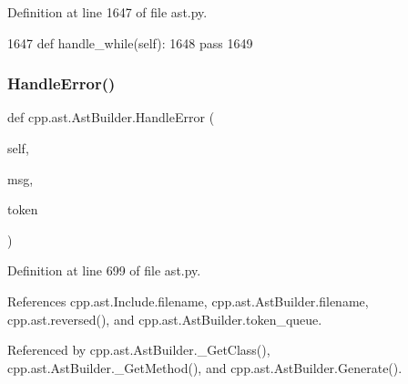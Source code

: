 Definition at line 1647 of file ast.\+py.


\begin{DoxyCode}
1647     \textcolor{keyword}{def }handle\_while(self):
1648         \textcolor{keywordflow}{pass}
1649 
\end{DoxyCode}
\mbox{\label{classcpp_1_1ast_1_1AstBuilder_a3e610662018d674f6c57ef19254cc470}} 
\subsubsection{\texorpdfstring{Handle\+Error()}{HandleError()}}
{\footnotesize\ttfamily def cpp.\+ast.\+Ast\+Builder.\+Handle\+Error (\begin{DoxyParamCaption}\item[{}]{self,  }\item[{}]{msg,  }\item[{}]{token }\end{DoxyParamCaption})}



Definition at line 699 of file ast.\+py.



References cpp.\+ast.\+Include.\+filename, cpp.\+ast.\+Ast\+Builder.\+filename, cpp.\+ast.\+reversed(), and cpp.\+ast.\+Ast\+Builder.\+token\+\_\+queue.



Referenced by cpp.\+ast.\+Ast\+Builder.\+\_\+\+Get\+Class(), cpp.\+ast.\+Ast\+Builder.\+\_\+\+Get\+Method(), and cpp.\+ast.\+Ast\+Builder.\+Generate().



